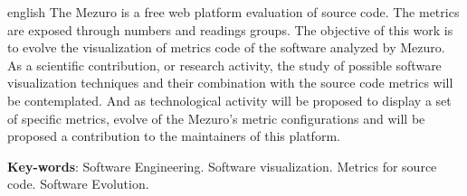 \begin{resumo}[Abstract]
 \begin{otherlanguage*}{english}
   The Mezuro is a free web platform evaluation of source code. The metrics are
   exposed through numbers and readings groups. The objective of this work is
   to evolve the visualization of metrics code of the software analyzed by
   Mezuro. As a scientific contribution, or research activity, the study of
   possible software visualization techniques and their combination with the
   source code metrics will be contemplated. And as technological activity will
   be proposed to display a set of specific metrics, evolve of the Mezuro's
   metric configurations and will be proposed a contribution to the maintainers
   of this platform.

   \vspace{\onelineskip}
 
   \noindent 
   \textbf{Key-words}: Software Engineering. Software visualization. Metrics
   for source code. Software Evolution.
 \end{otherlanguage*}
\end{resumo}
